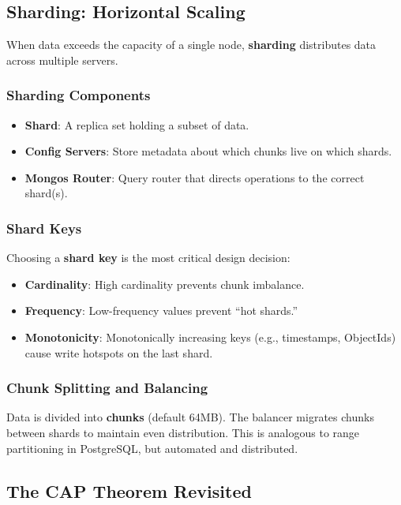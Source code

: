 \documentclass[12pt,a4paper]{article}
\begin{document}
\subsection{Sharding: Horizontal Scaling}

When data exceeds the capacity of a single node, \textbf{sharding} distributes data across multiple servers.

\subsubsection{Sharding Components}

\begin{itemize}[noitemsep]
    \item \textbf{Shard}: A replica set holding a subset of data.
    \item \textbf{Config Servers}: Store metadata about which chunks live on which shards.
    \item \textbf{Mongos Router}: Query router that directs operations to the correct shard(s).
\end{itemize}

\subsubsection{Shard Keys}

Choosing a \textbf{shard key} is the most critical design decision:

\begin{itemize}[noitemsep]
    \item \textbf{Cardinality}: High cardinality prevents chunk imbalance.
    \item \textbf{Frequency}: Low-frequency values prevent ``hot shards.''
    \item \textbf{Monotonicity}: Monotonically increasing keys (e.g., timestamps, ObjectIds) cause write hotspots on the last shard.
\end{itemize}

\subsubsection{Chunk Splitting and Balancing}

Data is divided into \textbf{chunks} (default 64MB). The balancer migrates chunks between shards to maintain even distribution. This is analogous to range partitioning in PostgreSQL, but automated and distributed.

\subsection{The CAP Theorem Revisited}
\end{document}
